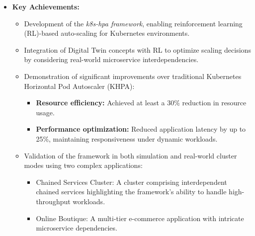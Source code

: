 \documentclass[conference]{IEEEtran}
\begin{document}
\begin{itemize}
    \item \textbf{Key Achievements:}
    \begin{itemize}
        \item Development of the \textit{k8s-hpa framework}, enabling reinforcement learning (RL)-based auto-scaling for Kubernetes environments.
        \item Integration of Digital Twin concepts with RL to optimize scaling decisions by considering real-world microservice interdependencies.
        \item Demonstration of significant improvements over traditional Kubernetes Horizontal Pod Autoscaler (KHPA):
        \begin{itemize}
            \item \textbf{Resource efficiency:} Achieved at least a 30\% reduction in resource usage.
            \item \textbf{Performance optimization:} Reduced application latency by up to 25\%, maintaining responsiveness under dynamic workloads.
        \end{itemize}
        \item Validation of the framework in both simulation and real-world cluster modes using two complex applications:
        \begin{itemize}
            \item Chained Services Cluster: A cluster comprising interdependent chained services highlighting the framework's ability to handle high-throughput workloads.
            \item Online Boutique: A multi-tier e-commerce application with intricate microservice dependencies.
        \end{itemize}
    \end{itemize}


\end{itemize}
\end{document}
